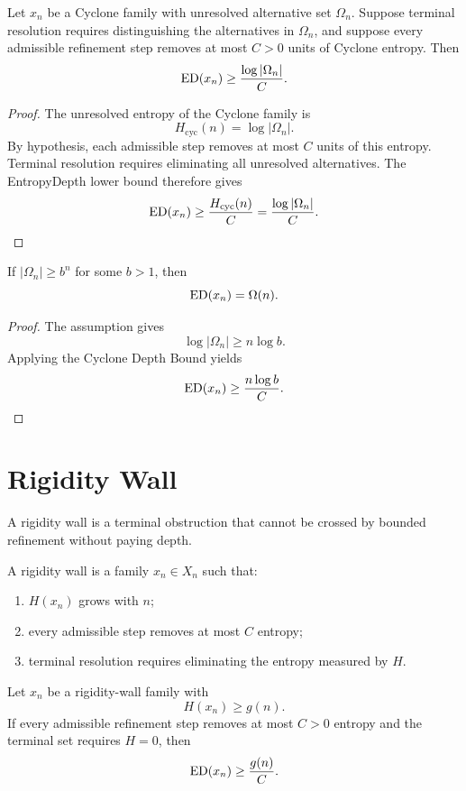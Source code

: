 \begin{theorem}
Let \(x_n\) be a Cyclone family with unresolved alternative set \(\Omega_n\).
Suppose terminal resolution requires distinguishing the alternatives in
\(\Omega_n\), and suppose every admissible refinement step removes at most
\(C>0\) units of Cyclone entropy. Then
\[
\mathrm{ED}(x_n)\ge \frac{\log |\Omega_n|}{C}.
\]
\end{theorem}

\begin{proof}
The unresolved entropy of the Cyclone family is
\[
H_{\mathrm{cyc}}(n)=\log |\Omega_n|.
\]
By hypothesis, each admissible step removes at most \(C\) units of this
entropy. Terminal resolution requires eliminating all unresolved alternatives.
The EntropyDepth lower bound therefore gives
\[
\mathrm{ED}(x_n)\ge \frac{H_{\mathrm{cyc}}(n)}{C}
=
\frac{\log |\Omega_n|}{C}.
\]
\end{proof}

\begin{theorem}
If \(|\Omega_n|\ge b^n\) for some \(b>1\), then
\[
\mathrm{ED}(x_n)=\Omega(n).
\]
\end{theorem}

\begin{proof}
The assumption gives
\[
\log |\Omega_n|\ge n\log b.
\]
Applying the Cyclone Depth Bound yields
\[
\mathrm{ED}(x_n)\ge \frac{n\log b}{C}.
\]
\end{proof}

\section{Rigidity Wall}

A rigidity wall is a terminal obstruction that cannot be crossed by bounded
refinement without paying depth.

\begin{definition}
A rigidity wall is a family \(x_n\in X_n\) such that:
\begin{enumerate}
\item \(H(x_n)\) grows with \(n\);
\item every admissible step removes at most \(C\) entropy;
\item terminal resolution requires eliminating the entropy measured by \(H\).
\end{enumerate}
\end{definition}

\begin{theorem}
Let \(x_n\) be a rigidity-wall family with
\[
H(x_n)\ge g(n).
\]
If every admissible refinement step removes at most \(C>0\) entropy and the
terminal set requires \(H=0\), then
\[
\mathrm{ED}(x_n)\ge \frac{g(n)}{C}.
\]
\end{theorem}

